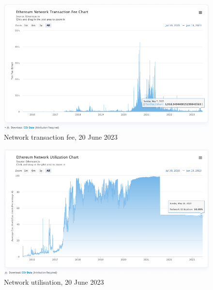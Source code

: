 \documentclass[UTF8]{article}
\begin{document}
{\begin{figure}[htbp]
\begin{center}
\includegraphics[width=0.9\linewidth]{images/nwfeetxns}
\caption{Network transaction fee, 20 June 2023}
\label{fig:nwfeetxns}
\end{center}
\end{figure}

\begin{figure}[htbp]
\begin{center}
\includegraphics[width=0.9\linewidth]{images/nwutil}
\caption{Network utilisation, 20 June 2023}
\label{fig:nwutil}
\end{center}
\end{figure}

}
\end{document}
